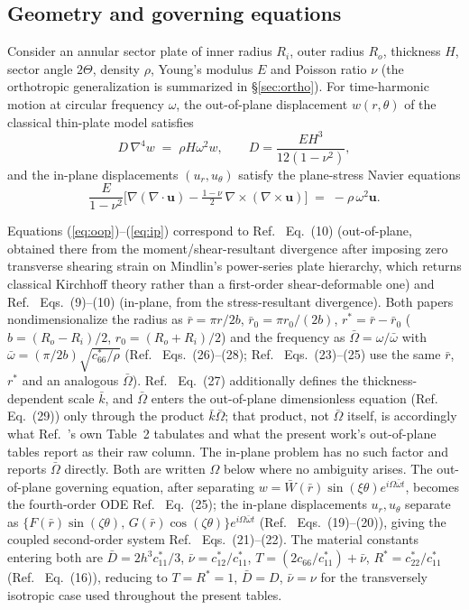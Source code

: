 \documentclass[11pt]{article}
\begin{document}
\subsection{Geometry and governing equations}
Consider an annular sector plate of inner radius $R_i$, outer radius
$R_o$, thickness $H$, sector angle $2\Theta$, density $\rho$, Young's
modulus $E$ and Poisson ratio $\nu$ (the orthotropic generalization is
summarized in \S\ref{sec:ortho}). For time-harmonic motion at circular
frequency $\omega$, the out-of-plane displacement $w(r,\theta)$ of the
classical thin-plate model satisfies
\begin{equation}
D\,\nabla^4 w \;=\; \rho H \omega^2 w, \qquad
D=\frac{EH^3}{12(1-\nu^2)},
\label{eq:oop}
\end{equation}
and the in-plane displacements $(u_r,u_\theta)$ satisfy the plane-stress
Navier equations
\begin{equation}
\frac{E}{1-\nu^2}\Big[\nabla(\nabla\!\cdot\!\mathbf{u})
-\tfrac{1-\nu}{2}\,\nabla\times(\nabla\times\mathbf{u})\Big]
\;=\;-\rho\,\omega^{2}\mathbf{u}.
\label{eq:ip}
\end{equation}
\begin{sloppypar}
Equations (\ref{eq:oop})--(\ref{eq:ip}) correspond to Ref.~\cite{seok1}
Eq.~(10) (out-of-plane, obtained there from the moment/shear-resultant
divergence after imposing zero transverse shearing strain on Mindlin's
power-series plate hierarchy, which returns classical Kirchhoff theory
rather than a first-order shear-deformable one) and Ref.~\cite{seok2} Eqs.~(9)--(10)
(in-plane, from the stress-resultant divergence). Both papers
nondimensionalize the radius as $\bar r=\pi r/2b$, $\bar r_0=\pi
r_0/(2b)$, $r^{*}=\bar r-\bar r_0$ ($b=(R_o-R_i)/2$, $r_0=(R_o+R_i)/2$)
and the frequency as $\bar\Omega=\omega/\bar\omega$ with $\bar
\omega=(\pi/2b)\sqrt{c^{*}_{66}/\rho}$ (Ref.~\cite{seok1} Eqs.~(26)--(28);
Ref.~\cite{seok2} Eqs.~(23)--(25) use the same $\bar r$, $r^{*}$ and an
analogous $\bar\Omega$). Ref.~\cite{seok1} Eq.~(27) additionally defines the
thickness-dependent scale $\bar k$, and $\bar\Omega$ enters the out-of-plane
dimensionless equation (Ref.~\cite{seok1} Eq.~(29)) only through the product
$\bar k\bar\Omega$; that product, not $\bar\Omega$ itself, is accordingly what
Ref.~\cite{seok1}'s own Table~2 tabulates and what the present work's
out-of-plane tables report as their raw column. The in-plane problem has no
such factor and reports $\bar\Omega$ directly. Both are written $\Omega$ below
where no ambiguity arises.
The out-of-plane governing equation, after separating
$w=\bar W(\bar r)\sin(\xi\theta)e^{i\Omega\bar\omega t}$, becomes the
fourth-order ODE Ref.~\cite{seok1} Eq.~(25); the in-plane displacements
$u_r,u_\theta$ separate as $\{F(\bar r)\sin(\zeta\theta),\,G(\bar
r)\cos(\zeta\theta)\}e^{i\Omega\bar\omega t}$ (Ref.~\cite{seok2} Eqs.~(19)--(20)),
giving the coupled second-order system Ref.~\cite{seok2} Eqs.~(21)--(22).
The material constants entering both are $\bar D=2h^{3}c^{*}_{11}/3$,
$\bar\nu=c^{*}_{12}/c^{*}_{11}$, $T=(2c_{66}/c^{*}_{11})+\bar\nu$,
$R^{*}=c^{*}_{22}/c^{*}_{11}$ (Ref.~\cite{seok1} Eq.~(16)), reducing to
$T=R^{*}=1$, $\bar D=D$, $\bar\nu=\nu$ for the transversely isotropic case
used throughout the present tables.
\end{sloppypar}
\end{document}
